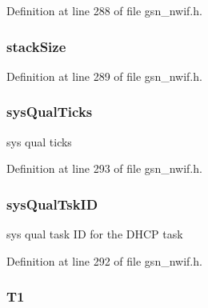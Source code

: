Definition at line 288 of file gsn\_\-nwif.h.

\hypertarget{a00168_a82cabdcaee43fc729a1da5551d429f73}{
\subsubsection[{stackSize}]{ {\bf stackSize}}}
\label{a00168_a82cabdcaee43fc729a1da5551d429f73}


Definition at line 289 of file gsn\_\-nwif.h.

\hypertarget{a00168_a3b8eb219c70a5f7fc6dcb9d9643cbc31}{
\subsubsection[{sysQualTicks}]{ {\bf sysQualTicks}}}
\label{a00168_a3b8eb219c70a5f7fc6dcb9d9643cbc31}
sys qual ticks 

Definition at line 293 of file gsn\_\-nwif.h.

\hypertarget{a00168_a3e06cb8fa58f49b7004a85c6f387ddc7}{
\subsubsection[{sysQualTskID}]{ {\bf sysQualTskID}}}
\label{a00168_a3e06cb8fa58f49b7004a85c6f387ddc7}
sys qual task ID for the DHCP task 

Definition at line 292 of file gsn\_\-nwif.h.

\hypertarget{a00168_abddb72aaa9095129e618bd0621412ab3}{
\subsubsection[{T1}]{ {\bf T1}}}
\label{a00168_abddb72aaa9095129e618bd0621412ab3}


